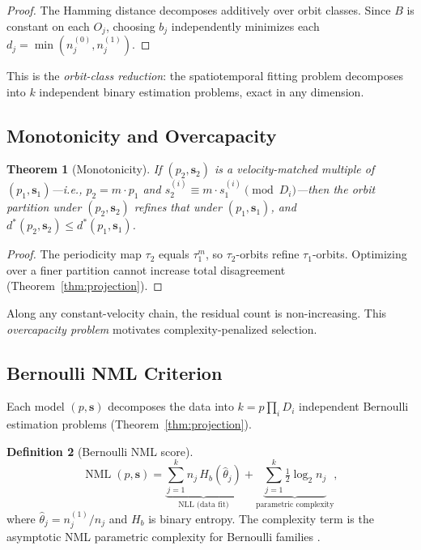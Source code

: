 \documentclass[letterpaper]{article}
\newtheorem{theorem}{Theorem}
\theoremstyle{definition}
\newtheorem{definition}[theorem]{Definition}
\theoremstyle{remark}
\newcommand{\bs}{\mathbf{s}}
\newcommand{\NML}{\operatorname{NML}}
\newcommand{\Hb}{H_b}
\begin{document}
\begin{proof}
The Hamming distance decomposes additively over orbit classes.
Since $B$ is constant on each $O_j$, choosing $b_j$ independently minimizes each $d_j = \min(n_j^{(0)}, n_j^{(1)})$.
\end{proof}

This is the \emph{orbit-class reduction}: the spatiotemporal fitting problem decomposes into $k$ independent binary estimation problems, exact in any dimension.

\subsection{Monotonicity and Overcapacity}

\begin{theorem}[Monotonicity]\label{thm:monotonicity}
If $(p_2, \bs_2)$ is a velocity-matched multiple of $(p_1, \bs_1)$---i.e., $p_2 = m \cdot p_1$ and $s_2^{(i)} \equiv m \cdot s_1^{(i)} \pmod{D_i}$---then the orbit partition under $(p_2, \bs_2)$ refines that under $(p_1, \bs_1)$, and $d^*(p_2, \bs_2) \leq d^*(p_1, \bs_1)$.
\end{theorem}

\begin{proof}
The periodicity map $\tau_2$ equals $\tau_1^m$, so $\tau_2$-orbits refine $\tau_1$-orbits.
Optimizing over a finer partition cannot increase total disagreement (Theorem~\ref{thm:projection}).
\end{proof}

Along any constant-velocity chain, the residual count is non-increasing.
This \emph{overcapacity problem} motivates complexity-penalized selection.

\subsection{Bernoulli NML Criterion}

Each model $(p, \bs)$ decomposes the data into $k = p \prod_i D_i$ independent Bernoulli estimation problems (Theorem~\ref{thm:projection}).

\begin{definition}[Bernoulli NML score]\label{def:nml}
\[
\NML(p, \bs) = \underbrace{\sum_{j=1}^{k} n_j \, \Hb(\hat{\theta}_j)}_{\text{NLL (data fit)}} + \underbrace{\sum_{j=1}^{k} \tfrac{1}{2} \log_2 n_j}_{\text{parametric complexity}},
\]
where $\hat{\theta}_j = n_j^{(1)}/n_j$ and $\Hb$ is binary entropy.
The complexity term is the asymptotic NML parametric complexity for Bernoulli families \citep{grunwald2007,shtarkov1987}.
\end{definition}
\end{document}
